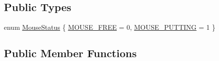 \subsection*{Public Types}
\begin{DoxyCompactItemize}
\item 
enum \hyperlink{classMouseHandler_af967315727aa1d435d55cc704e64fd1a}{Mouse\+Status} \{ \hyperlink{classMouseHandler_af967315727aa1d435d55cc704e64fd1aa5aba71e1304fdbe0f2899b6b1345d74a}{M\+O\+U\+S\+E\+\_\+\+F\+R\+E\+E} = 0, 
\hyperlink{classMouseHandler_af967315727aa1d435d55cc704e64fd1aa440928d86f44f388601ede4e6b91df76}{M\+O\+U\+S\+E\+\_\+\+P\+U\+T\+T\+I\+N\+G} = 1
 \}
\end{DoxyCompactItemize}
\subsection*{Public Member Functions}
